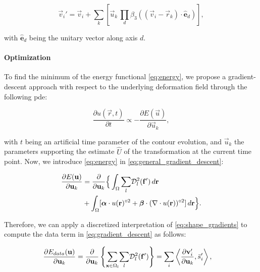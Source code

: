   \begin{equation}
    \vec{v}_i' = \vec{v}_i + \sum_k \left[ \vec{u}_k \, \underset{d}{\prod}
      \beta_3( (\vec{v}_i - \vec{r}_k) \cdot \hat{\mathbf{e}}_d ) \right],
  \label{eq:transformation}
  \end{equation}

  with $\hat{\mathbf{e}}_d$ being the unitary vector along axis $d$.


\paragraph*{Optimization}
\label{sec:gradient_descent}
To find the minimum of the energy functional \eqref{eq:energy},
  we propose a gradient-descent approach with respect to the underlying
  deformation field through the following \gls*{pde}:

  \begin{equation}
  \frac{\partial u(\vec{r},t)}{\partial t} \propto - \frac{\partial E(\vec{u})}{\partial \vec{u}_k},
  \label{eq:general_gradient_descent}
  \end{equation}

  with $t$ being an artificial time parameter of the contour
  evolution, and $\vec{u}_k$ the parameters supporting the estimate
  $\hat{U}$ of the transformation at the current time point.
Now, we introduce \eqref{eq:energy} in \eqref{eq:general_gradient_descent}:

  \begin{align}
  \frac{\partial E(\vec{u})}{\partial \vec{u}_k} &=
  \frac{ \partial }{\partial \vec{u}_k} \Big\{
  \int_{\Omega} \underset{l}{\sum} \mdist{f'}{l} \,d\vec{r} \notag\\
  &+ \int_{\Omega} [ \boldsymbol{\alpha} \cdot u(\vec{r})^{\circ2}
  + \boldsymbol{\beta} \cdot (\nabla \cdot u(\vec{r}))^{\circ2} ] \,d\vec{r}
  \Big\}.
  \label{eq:gradient_descent}
  \end{align}


Therefore, we can apply a discretized interpretation of \eqref{eq:shape_gradients}
  to compute the data term in \eqref{eq:gradient_descent} as follows:

  \begin{align}
  \frac{\partial E_{data}(\vec{u})}{\partial \vec{u}_k} &=
  \frac{ \partial }{\partial \vec{u}_k} \left\{
   \underset{\vec{x} \in \Omega_l}{\sum} \underset{l}{\sum} \mdist{f'}{l} \right\}
  = \underset{i}{\sum}
   \left\langle \frac{\partial \vec{v}_i'}{\partial \vec{u}_k}, \bar{s}_i'\right\rangle,
  \label{eq:gradient_wshape}
  \end{align}

